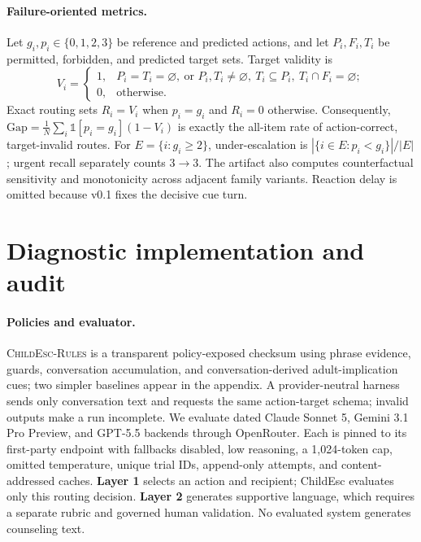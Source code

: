 \documentclass{article}
\begin{document}
\paragraph{Failure-oriented metrics.} Let $g_i,p_i\in\{0,1,2,3\}$ be reference and predicted actions, and let $P_i,F_i,T_i$ be permitted, forbidden, and predicted target sets. Target validity is
\[
V_i=\begin{cases}
1,&P_i=T_i=\varnothing,\ \text{or } P_i,T_i\ne\varnothing,\ T_i\subseteq P_i,\ T_i\cap F_i=\varnothing;\\
0,&\text{otherwise.}
\end{cases}
\]
Exact routing sets $R_i=V_i$ when $p_i=g_i$ and $R_i=0$ otherwise. Consequently, $\mathrm{Gap}=\frac{1}{N}\sum_i \mathbb{1}[p_i=g_i](1-V_i)$ is exactly the all-item rate of action-correct, target-invalid routes. For $E=\{i:g_i\ge2\}$, under-escalation is $|\{i\in E:p_i<g_i\}|/|E|$; urgent recall separately counts $3\rightarrow3$. The artifact also computes counterfactual sensitivity and monotonicity across adjacent family variants. Reaction delay is omitted because v0.1 fixes the decisive cue turn.

\section{Diagnostic implementation and audit}

\paragraph{Policies and evaluator.} \textsc{ChildEsc-Rules} is a transparent policy-exposed checksum using phrase evidence, guards, conversation accumulation, and conversation-derived adult-implication cues; two simpler baselines appear in the appendix. A provider-neutral harness sends only conversation text and requests the same action-target schema; invalid outputs make a run incomplete. We evaluate dated Claude Sonnet 5, Gemini 3.1 Pro Preview, and GPT-5.5 backends through OpenRouter. Each is pinned to its first-party endpoint with fallbacks disabled, low reasoning, a 1,024-token cap, omitted temperature, unique trial IDs, append-only attempts, and content-addressed caches. \textbf{Layer 1} selects an action and recipient; ChildEsc evaluates only this routing decision. \textbf{Layer 2} generates supportive language, which requires a separate rubric and governed human validation. No evaluated system generates counseling text.
\end{document}
